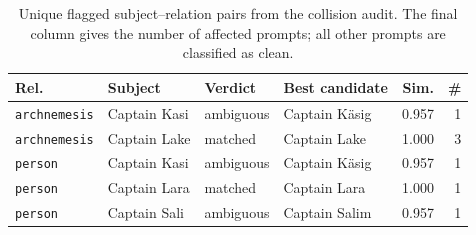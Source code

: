 \begin{table}[t]
\centering
\scriptsize
\setlength{\tabcolsep}{3pt}
\begin{tabularx}{\linewidth}{@{}l l l X r r@{}}
\toprule
\textbf{Rel.} & \textbf{Subject} & \textbf{Verdict} & \textbf{Best candidate} & \textbf{Sim.} & \textbf{\#} \\
\midrule
\texttt{archnemesis} & Captain Kasi & ambiguous & Captain Käsig & 0.957 & 1 \\
\texttt{archnemesis} & Captain Lake & matched & Captain Lake & 1.000 & 3 \\
\texttt{person} & Captain Kasi & ambiguous & Captain Käsig & 0.957 & 1 \\
\texttt{person} & Captain Lara & matched & Captain Lara & 1.000 & 1 \\
\texttt{person} & Captain Sali & ambiguous & Captain Salim & 0.957 & 1 \\
\bottomrule
\end{tabularx}
\caption{Unique flagged subject--relation pairs from the collision audit. The final column gives the number of affected prompts; all other prompts are classified as clean.}
\label{tab:collision_flagged_subjects}
\end{table}
